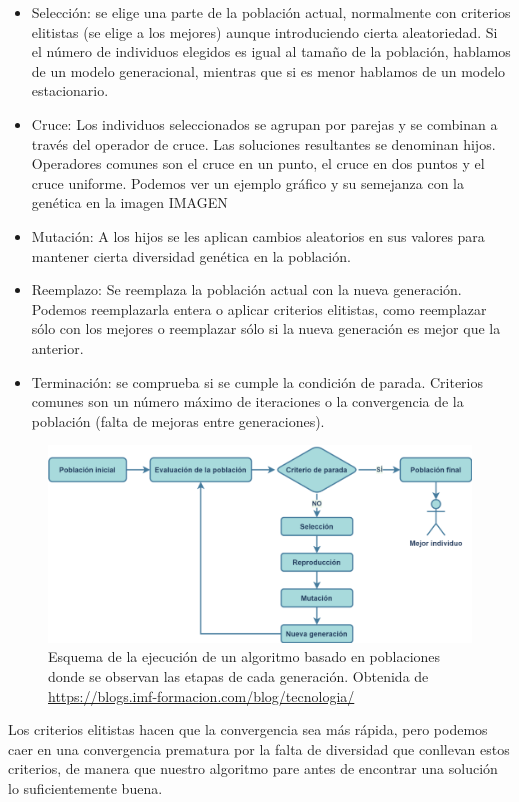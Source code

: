 \begin{itemize}
	\item Selección: se elige una parte de la población actual, normalmente con criterios elitistas (se elige a los mejores) aunque introduciendo cierta aleatoriedad. Si el número de individuos elegidos es igual al tamaño de la población, hablamos de un modelo generacional, mientras que si es menor hablamos de un modelo estacionario. 
	\item Cruce: Los individuos seleccionados se agrupan por parejas y se combinan a través del operador de cruce. Las soluciones resultantes se denominan hijos. Operadores comunes son el cruce en un punto, el cruce en dos puntos y el cruce uniforme. Podemos ver un ejemplo gráfico y su semejanza con la genética en la imagen IMAGEN
	\item Mutación: A los hijos se les aplican cambios aleatorios en sus valores para mantener cierta diversidad genética en la población.
	\item Reemplazo: Se reemplaza la población actual con la nueva generación. Podemos reemplazarla entera o aplicar criterios elitistas, como reemplazar sólo con los mejores o reemplazar sólo si la nueva generación es mejor que la anterior.
	\item Terminación: se comprueba si se cumple la condición de parada. Criterios comunes son un número máximo de iteraciones o la convergencia de la población (falta de mejoras entre generaciones).
\end{itemize}

\begin{figure}
    \centering
    \includegraphics[width=0.75\linewidth]{Plantilla_TFG_latex//imagenes//Inf//2.Fund/alg_gen.png}
    \caption{Esquema de la ejecución de un algoritmo basado en poblaciones donde se observan las etapas de cada generación. Obtenida de \url{https://blogs.imf-formacion.com/blog/tecnologia/}}
    \label{fig:gen_alg}
\end{figure}

Los criterios elitistas hacen que la convergencia sea más rápida, pero podemos caer en una convergencia prematura por la falta de diversidad que conllevan estos criterios, de manera que nuestro algoritmo pare antes de encontrar una solución lo suficientemente buena.




